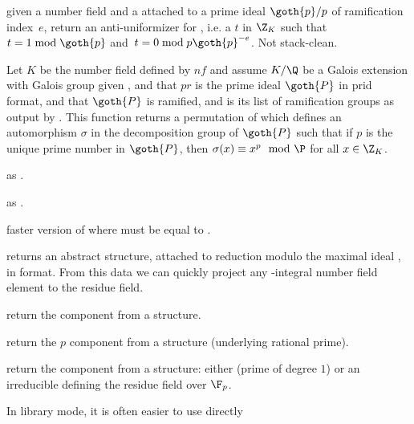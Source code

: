  given a number field  and
a  attached to a prime ideal $\goth{p} / p$ of ramification index~$e$,
return an anti-uniformizer for , i.e. a $t$ in $\Z_K$ such that~$t = 1
\bmod{\goth{p}}$ and~$t = 0 \bmod{p \goth{p}^{-e}}$. Not stack-clean.


Let $K$ be the number field defined by $nf$ and assume $K/\Q$ be a
Galois extension with Galois group given ,
and that $pr$ is the prime ideal $\goth{P}$ in prid format, and that
$\goth{P}$ is ramified, and  is its list of ramification groups as
output by .
This function returns a permutation of  which defines an
automorphism $\sigma$ in the decomposition group of $\goth{P}$
such that if $p$ is the unique prime number
in $\goth{P}$, then $\sigma(x)\equiv x^p\mod\P$ for all $x\in\Z_K$.

as .

as .

faster version of  where
 must be equal to .


 returns an abstract 
structure, attached to reduction modulo the maximal ideal , in
 format. From this data we can quickly project any
-integral number field element to the residue field.

 return the  component from a 
structure.

 return the $p$ component from a 
structure (underlying rational prime).

 return the  component from a 
structure: either  (prime of degree $1$) or an irreducible
 defining the residue field over $\F_p$.

In library mode, it is often easier to use directly

